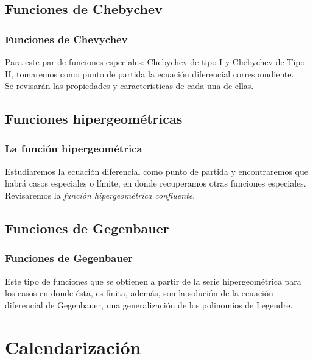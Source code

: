 \subsection{Funciones de Chebychev}
\begin{frame}
\frametitle{Funciones de Chevychev}
Para este par de funciones especiales: Chebychev de tipo I y Chebychev de Tipo II, tomaremos como punto de partida la ecuación diferencial correspondiente.
\\
\bigskip
\pause
Se revisarán las propiedades y características de cada una de ellas.
\end{frame}
\subsection{Funciones hipergeométricas}
\begin{frame}
\frametitle{La función hipergeométrica}
Estudiaremos la ecuación diferencial como punto de partida y encontraremos que habrá casos especiales o límite, en donde recuperamos otras funciones especiales.
\\
\bigskip
Revisaremos la \emph{función hipergeométrica confluente}.
\end{frame}
\subsection{Funciones de Gegenbauer}
\begin{frame}
\frametitle{Funciones de Gegenbauer}
Este tipo de funciones que se obtienen a partir de la serie hipergeométrica para los casos en donde ésta, es finita, además, son la solución de la ecuación diferencial de Gegenbauer, una generalización de los polinomios de Legendre.
\end{frame}
\section{Calendarización}
